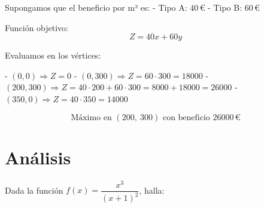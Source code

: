 \documentclass[addpoints,spanish, 12pt,a4paper]{exam}
\renewcommand*\half{.5}
\begin{document}
\begin{questions}
\begin{parts}
\begin{solution}
Supongamos que el beneficio por m³ es:
- Tipo A: \( 40\,\euro \)
- Tipo B: \( 60\,\euro \)

Función objetivo:  
\[
Z = 40x + 60y
\]

Evaluamos en los vértices:

- \( (0, 0) \Rightarrow Z = 0 \)
- \( (0, 300) \Rightarrow Z = 60 \cdot 300 = 18000 \)
- \( (200, 300) \Rightarrow Z = 40 \cdot 200 + 60 \cdot 300 = 8000 + 18000 = 26000 \)
- \( (350, 0) \Rightarrow Z = 40 \cdot 350 = 14000 \)

\[
\text{Máximo en } \boxed{(200,\ 300)} \text{ con beneficio } \boxed{26000\,\euro}
\]
\end{solution}
\end{parts}

\section{Análisis}



\question[2\half] Dada la función $f(x) = \dfrac{x^3}{(x+1)^2}$, halla:
\end{questions}
\end{document}
